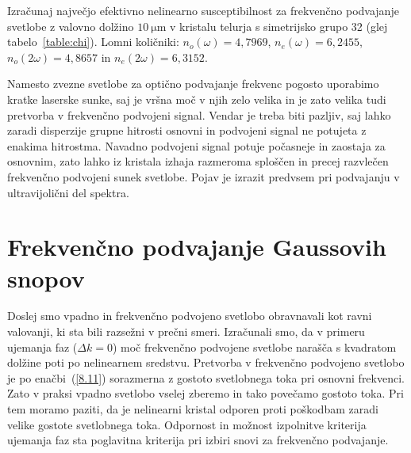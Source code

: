 \begin{definition}
Izračunaj največjo efektivno nelinearno susceptibilnost za
frekvenčno podvajanje svetlobe z valovno
dolžino $10~\si{\micro\metre}$ v kristalu telurja s simetrijsko grupo 32 (glej tabelo~\ref{table:chi}). 
Lomni količniki: $n_o(\omega) = 4,7969$, 
$n_e(\omega) = 6,2455$, $n_o(2\omega) = 4,8657$ in $n_e(2\omega) = 6,3152$.
\end{definition}

\begin{remark}
Namesto zvezne svetlobe za optično podvajanje frekvenc pogosto uporabimo kratke laserske sunke, saj je 
vršna moč v njih zelo velika in je zato velika tudi pretvorba v frekvenčno podvojeni signal.
Vendar je treba biti pazljiv, saj lahko zaradi disperzije grupne hitrosti osnovni in 
podvojeni signal ne potujeta z enakima hitrostma. Navadno podvojeni signal potuje 
počasneje in zaostaja za osnovnim, zato lahko iz kristala izhaja razmeroma sploščen in 
precej razvlečen frekvenčno podvojeni sunek svetlobe. Pojav je izrazit predvsem pri podvajanju v
ultravijolični del spektra.
\end{remark}

\section{Frekvenčno podvajanje Gaussovih snopov}
Doslej smo vpadno in frekvenčno podvojeno svetlobo obravnavali kot ravni valovanji,
ki sta bili razsežni v prečni smeri. Izračunali smo, da v primeru 
ujemanja faz ($\Delta k=0$)
moč frekvenčno podvojene svetlobe narašča s kvadratom dolžine poti po nelinearnem
sredstvu. Pretvorba v frekvenčno podvojeno svetlobo je po enačbi~(\ref{8.11}) sorazmerna
z gostoto svetlobnega toka pri osnovni frekvenci.
Zato v praksi vpadno svetlobo vselej zberemo in tako povečamo gostoto toka. 
Pri tem moramo paziti, da je nelinearni kristal odporen proti poškodbam
zaradi velike gostote svetlobnega toka. Odpornost in možnost izpolnitve kriterija ujemanja 
faz sta poglavitna kriterija pri izbiri snovi za frekvenčno podvajanje. 

